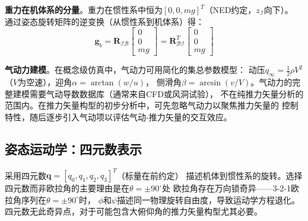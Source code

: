 \documentclass[a4paper,12pt]{ctexart}
\theoremstyle{plain}
\theoremstyle{definition}
\begin{document}
\textbf{重力在机体系的分量}。重力在惯性系中恒为$[0, 0, mg]^T$（NED约定，$z_{\mathcal{I}}$向下）。
通过姿态旋转矩阵的逆变换（从惯性系到机体系）得：
\begin{equation}
    \bm{g}_b = \bm{R}_{\mathcal{I}\mathcal{B}}
    \begin{bmatrix} 0 \\ 0 \\ mg \end{bmatrix}
    = \bm{R}_{\mathcal{B}\mathcal{I}}^T
    \begin{bmatrix} 0 \\ 0 \\ mg \end{bmatrix}
    \label{eq:gravity_body}
\end{equation}

\textbf{气动力建模}。在概念级仿真中，气动力可用简化的集总参数模型\cite{beard2012small}：
动压$q_\infty = \frac{1}{2}\rho V^2$（$V$为空速），迎角$\alpha = \arctan(w/u)$，
侧滑角$\beta = \arcsin(v/V)$。气动力的完整建模需要气动导数数据库（通常来自CFD或风洞试验），
不在纯推力矢量分析的范围内。在推力矢量构型的初步分析中，可先忽略气动力以聚焦推力矢量的
控制特性，随后逐步引入气动项以评估气动-推力矢量的交互效应。

\subsection{姿态运动学：四元数表示}

采用四元数$\bm{q} = [q_0, q_1, q_2, q_3]^T$（标量在前约定）
描述机体到惯性系的旋转。选择四元数而非欧拉角的主要理由是在$\theta = \pm 90^\circ$处
欧拉角存在万向锁奇异——3-2-1欧拉角序列在$\theta = \pm 90^\circ$时，
$\phi$和$\psi$描述同一物理旋转自由度，导致运动学方程退化。
四元数无此奇异点，对于可能包含大俯仰角的推力矢量构型尤其必要\cite{markley2014fundamentals,kuipers1999quaternions}。
\end{document}

